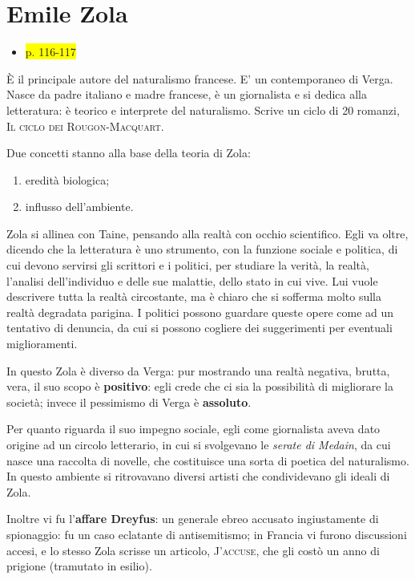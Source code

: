 \documentclass{book}
\newcommand{\pagine}[1]{\colorbox{yellow}{#1}}
\newcounter{mar}
\begin{document}

\chapter{Emile Zola}

\begin{itemize}
\item
  \pagine{p. 116-117}
\end{itemize}

È il principale autore del naturalismo francese. E' un contemporaneo di
Verga. Nasce da padre italiano e madre francese, è un giornalista e si
dedica alla letteratura: è teorico e interprete del naturalismo. Scrive
un ciclo di 20 romanzi, \textsc{Il ciclo dei Rougon-Macquart}.

Due concetti stanno alla base della teoria di Zola: 
\begin{enumerate}
\item eredità biologica; 
\item influsso dell'ambiente.
\end{enumerate}

Zola si allinea con Taine, pensando alla realtà con occhio scientifico.
Egli va oltre, dicendo che la letteratura è uno strumento, con la
funzione sociale e politica, di cui devono servirsi gli scrittori e i
politici, per studiare la verità, la realtà, l'analisi dell'individuo e
delle sue malattie, dello stato in cui vive. Lui vuole descrivere tutta
la realtà circostante, ma è chiaro che si sofferma molto sulla realtà
degradata parigina. I politici possono guardare queste opere come ad un
tentativo di denuncia, da cui si possono cogliere dei suggerimenti per
eventuali miglioramenti.

In questo Zola è diverso da Verga: pur mostrando una realtà negativa,
brutta, vera, il suo scopo è \textbf{positivo}: egli crede che ci sia la
possibilità di migliorare la società; invece il pessimismo di Verga è
\textbf{assoluto}.

Per quanto riguarda il suo impegno sociale, egli come giornalista aveva
dato origine ad un circolo letterario, in cui si svolgevano le
\emph{serate di Medain}, da cui nasce una raccolta di novelle, che
costituisce una sorta di poetica del naturalismo. In questo ambiente si
ritrovavano diversi artisti che condividevano gli ideali di Zola.

Inoltre vi fu l'\textbf{affare Dreyfus}: un generale ebreo accusato
ingiustamente di spionaggio: fu un caso eclatante di antisemitismo; in
Francia vi furono discussioni accesi, e lo stesso Zola scrisse un
articolo, \textsc{J'accuse}, che gli costò un anno di prigione (tramutato
in esilio).
\end{document}
